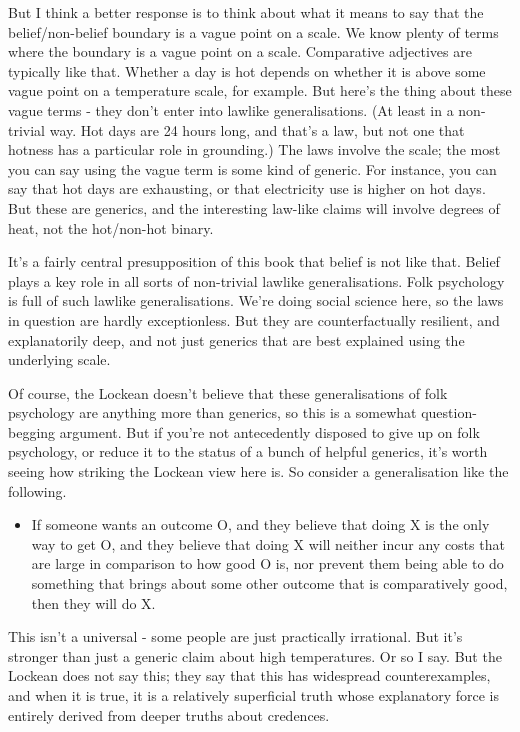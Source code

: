 \documentclass[11pt,]{book}
\providecommand{\tightlist}{%
  \setlength{\itemsep}{0pt}\setlength{\parskip}{0pt}}
\begin{document}
But I think a better response is to think about what it means to say that the belief/non-belief boundary is a vague point on a scale. We know plenty of terms where the boundary is a vague point on a scale. Comparative adjectives are typically like that. Whether a day is hot depends on whether it is above some vague point on a temperature scale, for example. But here's the thing about these vague terms - they don't enter into lawlike generalisations. (At least in a non-trivial way. Hot days are 24 hours long, and that's a law, but not one that hotness has a particular role in grounding.) The laws involve the scale; the most you can say using the vague term is some kind of generic. For instance, you can say that hot days are exhausting, or that electricity use is higher on hot days. But these are generics, and the interesting law-like claims will involve degrees of heat, not the hot/non-hot binary.

It's a fairly central presupposition of this book that belief is not like that. Belief plays a key role in all sorts of non-trivial lawlike generalisations. Folk psychology is full of such lawlike generalisations. We're doing social science here, so the laws in question are hardly exceptionless. But they are counterfactually resilient, and explanatorily deep, and not just generics that are best explained using the underlying scale.

Of course, the Lockean doesn't believe that these generalisations of folk psychology are anything more than generics, so this is a somewhat question-begging argument. But if you're not antecedently disposed to give up on folk psychology, or reduce it to the status of a bunch of helpful generics, it's worth seeing how striking the Lockean view here is. So consider a generalisation like the following.

\begin{itemize}
\tightlist
\item
  If someone wants an outcome O, and they believe that doing X is the only way to get O, and they believe that doing X will neither incur any costs that are large in comparison to how good O is, nor prevent them being able to do something that brings about some other outcome that is comparatively good, then they will do X.
\end{itemize}

This isn't a universal - some people are just practically irrational. But it's stronger than just a generic claim about high temperatures. Or so I say. But the Lockean does not say this; they say that this has widespread counterexamples, and when it is true, it is a relatively superficial truth whose explanatory force is entirely derived from deeper truths about credences.
\end{document}
